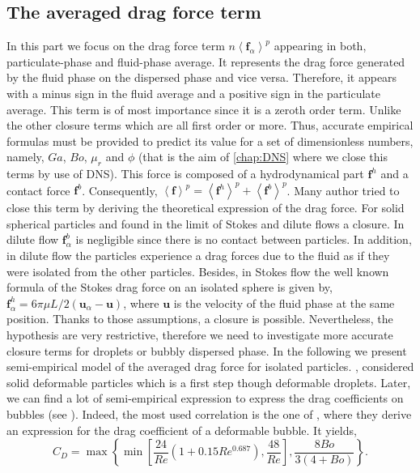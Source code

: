 \subsection{The averaged drag force term}
In this part we focus on the drag force term $n\left<\bm{f}_\alpha\right>^p$ appearing in both, particulate-phase and fluid-phase average.
It represents the drag force generated by the fluid phase on the dispersed phase and vice versa.
Therefore, it appears with a minus sign in the fluid average and a positive sign in the particulate average.  
This term is of most importance since it is  a zeroth order term. 
Unlike the other closure terms which are all first order or more. 
Thus, accurate empirical formulas must be provided to predict its value for a set of dimensionless numbers, namely, $Ga$, $Bo$, $\mu_r$ and $\phi$ (that is the aim of \ref{chap:DNS} where we close this terms by use of DNS). 
This force is composed of a hydrodynamical part $\bm{f}^h$ and a contact force $\bm{f}^{b}$.
Consequently, $\left<\bm{f}\right>^p=\left<\bm{f}^h\right>^p+\left<\bm{f}^b\right>^p$.
Many author tried to close this term by deriving the theoretical expression of the drag force.
For solid spherical particles \cite{jackson1997locally} and \cite{zhang1994ensemble} found in the limit of Stokes and dilute flows a closure.
In dilute flow $\bm{f}^b_\alpha$ is negligible since there is no contact between particles.
In addition, in dilute flow the particles experience a drag forces due to the fluid as if they were isolated from the other particles. 
Besides, in Stokes flow the well known formula of the Stokes drag force on an isolated sphere is given by, $\bm{f}_\alpha^h =  6\pi\mu L/2(\bm{u}_\alpha - \bm{u})$, where $\bm{u}$ is the velocity of the fluid phase at the same position. 
Thanks to those assumptions, a closure is possible. 
Nevertheless, the hypothesis are very restrictive, therefore we need to investigate more accurate closure terms for droplets or bubbly dispersed phase. 
In the following we present semi-empirical model of the averaged drag force for isolated particles.
\citet{loth2008drag}, considered solid deformable particles which is a first step though deformable droplets. 
Later, we can find a lot of semi-empirical expression to express the drag coefficients on bubbles (see \citet[Appendix B]{gemello2018modelling}). 
Indeed, the most used correlation is the one of \citet{tomiyama1998drag}, where they derive an expression for the drag coefficient of a deformable bubble. 
It yields,
\begin{equation}
    C_D = \max\left\{
        \min\left[
        \frac{24}{Re}\left(
            1 + 0.15Re^{0.687}
        \right),
        \frac{48}{Re}  
        \right],
        \frac{8Bo}{3(4+Bo)}
    \right\}.
\end{equation}
